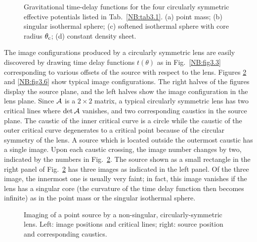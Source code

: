 \documentclass[a4paper,10pt]{article} %
\begin{document}
\begin{figure}[ht] %
\begin{center}
\begin{minipage}[t]{0.6\hsize}
\end{minipage}
\end{center}
\caption{Gravitational time-delay functions for the four circularly
  symmetric effective potentials listed in Tab.\
  \protect\ref{NB:tab3.1}. (a) point mass; (b) singular isothermal
  sphere; (c) softened isothermal sphere with core radius $\theta_{\rm
  c}$; (d) constant density sheet.}
\label{NB:fig3.4}
\end{figure}

The image configurations produced by a circularly symmetric lens are
easily discovered by drawing time delay functions $t(\theta)$ as in
Fig.\ \ref{NB:fig3.3} corresponding to various offsets of the source
with respect to the lens. Figures \ref{NB:fig3.5} and \ref{NB:fig3.6}
show typical image configurations. The right halves of the figures
display the source plane, and the left halves show the image
configuration in the lens plane. Since ${\cal A}$ is a $2\times2$
matrix, a typical circularly symmetric lens has two critical lines
where $\det{\cal A}$ vanishes, and two corresponding caustics in the
source plane. The caustic of the inner critical curve is a circle
while the caustic of the outer critical curve degenerates to a
critical point because of the circular symmetry of the lens. A source
which is located outside the outermost caustic has a single
image. Upon each caustic crossing, the image number changes by two,
indicated by the numbers in Fig.\ \ref{NB:fig3.5}. The source shown as
a small rectangle in the right panel of Fig.\ \ref{NB:fig3.5} has
three images as indicated in the left panel. Of the three image, the
innermost one is usually very faint; in fact, this image vanishes if
the lens has a singular core (the curvature of the time delay function
then becomes infinite) as in the point mass or the singular isothermal
sphere.

\begin{figure}[ht] %
\begin{center}
\begin{minipage}[t]{0.6\hsize}
\end{minipage}
\end{center}
\caption{Imaging of a point source by a non-singular,
  circularly-symmetric lens. Left: image positions and critical lines;
  right: source position and corresponding caustics.}
\label{NB:fig3.5}
\end{figure}
\end{document}
